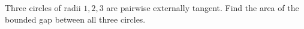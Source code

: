 Three circles of radii $1,2,3$ are pairwise externally tangent. Find the area of the bounded gap between all three circles.

